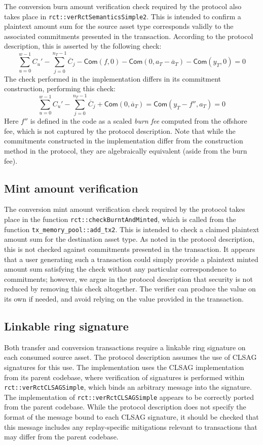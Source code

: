\documentclass{article}
\newcommand{\func}[1]{\mathsf{#1}}
\begin{document}
The conversion burn amount verification check required by the protocol also takes place in \texttt{rct::verRctSemanticsSimple2}.
This is intended to confirm a plaintext amount sum for the source asset type corresponds validly to the associated commitments presented in the transaction.
According to the protocol description, this is asserted by the following check:
$$\sum_{u=0}^{w-1} C_u' - \sum_{j=0}^{n_T-1} \overline{C}_j - \func{Com}(f,0) - \func{Com}(0,a_T - \overline{a}_T) - \func{Com}(y_T,0) = 0$$
The check performed in the implementation differs in its commitment construction, performing this check:
$$\sum_{u=0}^{w-1} C_u' - \sum_{j=0}^{n_T-1} \overline{C}_j + \func{Com}(0,\overline{a}_T) = \func{Com}(y_T - f'',a_T) = 0$$
Here $f''$ is defined in the code as a scaled \textit{burn fee} computed from the offshore fee, which is not captured by the protocol description.
Note that while the commitments constructed in the implementation differ from the construction method in the protocol, they are algebraically equivalent (aside from the burn fee).


\subsection{Mint amount verification}

The conversion mint amount verification check required by the protocol takes place in the function \texttt{rct::checkBurntAndMinted}, which is called from the function \texttt{tx\_memory\_pool::add\_tx2}.
This is intended to check a claimed plaintext amount sum for the destination asset type.
As noted in the protocol description, this is not checked against commitments presented in the transaction.
It appears that a user generating such a transaction could simply provide a plaintext minted amount sum satisfying the check without any particular correspondence to commitments; however, we argue in the protocol description that security is not reduced by removing this check altogether.
The verifier can produce the value on its own if needed, and avoid relying on the value provided in the transaction.


\subsection{Linkable ring signature}

Both transfer and conversion transactions require a linkable ring signature on each consumed source asset.
The protocol description assumes the use of CLSAG signatures for this use.
The implementation uses the CLSAG implementation from its parent codebase, where verification of signatures is performed within \texttt{rct::verRctCLSAGSimple}, which binds an arbitrary message into the signature.
The implementation of \texttt{rct::verRctCLSAGSimple} appears to be correctly ported from the parent codebase.
While the protocol description does not specify the format of the message bound to each CLSAG signature, it should be checked that this message includes any replay-specific mitigations relevant to transactions that may differ from the parent codebase.
\end{document}
